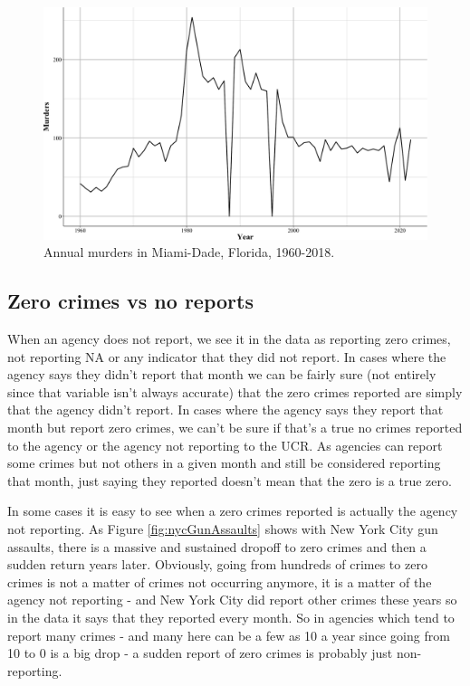 \documentclass[
  12pt,
  openany]{book}
\begin{document}
\begin{figure}
\centering
\includegraphics{ucrbook_files/figure-latex/miamiDadeMurderAnnual-1.pdf}
\caption{\label{fig:miamiDadeMurderAnnual}Annual murders in Miami-Dade, Florida, 1960-2018.}
\end{figure}

\hypertarget{zero-crimes-vs-no-reports}{%
\subsection{Zero crimes vs no reports}\label{zero-crimes-vs-no-reports}}

When an agency does not report, we see it in the data as reporting zero crimes, not reporting NA or any indicator that they did not report. In cases where the agency says they didn't report that month we can be fairly sure (not entirely since that variable isn't always accurate) that the zero crimes reported are simply that the agency didn't report. In cases where the agency says they report that month but report zero crimes, we can't be sure if that's a true no crimes reported to the agency or the agency not reporting to the UCR. As agencies can report some crimes but not others in a given month and still be considered reporting that month, just saying they reported doesn't mean that the zero is a true zero.

In some cases it is easy to see when a zero crimes reported is actually the agency not reporting. As Figure \ref{fig:nycGunAssaults} shows with New York City gun assaults, there is a massive and sustained dropoff to zero crimes and then a sudden return years later. Obviously, going from hundreds of crimes to zero crimes is not a matter of crimes not occurring anymore, it is a matter of the agency not reporting - and New York City did report other crimes these years so in the data it says that they reported every month. So in agencies which tend to report many crimes - and many here can be a few as 10 a year since going from 10 to 0 is a big drop - a sudden report of zero crimes is probably just non-reporting.
\end{document}
